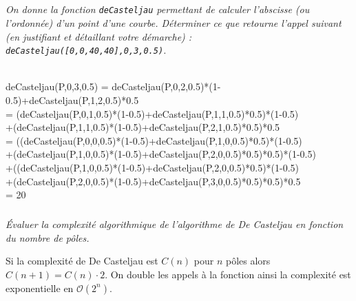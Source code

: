 \documentclass[10pt,fleqn]{article} %
\begin{document}
\subparagraph{}
\textit{On donne la fonction \texttt{deCasteljau} permettant de calculer l'abscisse (ou l'ordonnée) d'un point d'une courbe. Déterminer ce que retourne l'appel suivant (en justifiant et détaillant votre démarche) : ~\\
\texttt{deCasteljau([0,0,40,40],0,3,0.5)}.}
\ifprof
\begin{corrige} ~\\

\noindent deCasteljau(P,0,3,0.5) =  deCasteljau(P,0,2,0.5)*(1-0.5)+deCasteljau(P,1,2,0.5)*0.5 ~\\

\noindent  = (deCasteljau(P,0,1,0.5)*(1-0.5)+deCasteljau(P,1,1,0.5)*0.5)*(1-0.5) ~\\ 
\indent+(deCasteljau(P,1,1,0.5)*(1-0.5)+deCasteljau(P,2,1,0.5)*0.5)*0.5 ~\\

\noindent  = ((deCasteljau(P,0,0,0.5)*(1-0.5)+deCasteljau(P,1,0,0.5)*0.5)*(1-0.5)~\\ 
\indent +(deCasteljau(P,1,0,0.5)*(1-0.5)+deCasteljau(P,2,0,0.5)*0.5)*0.5)*(1-0.5) ~\\ 
\indent+((deCasteljau(P,1,0,0.5)*(1-0.5)+deCasteljau(P,2,0,0.5)*0.5)*(1-0.5)  ~\\
\indent +(deCasteljau(P,2,0,0.5)*(1-0.5)+deCasteljau(P,3,0,0.5)*0.5)*0.5)*0.5 ~\\

\noindent  = 20
\end{corrige}
\else
\fi

\subparagraph{}
\textit{Évaluer la complexité algorithmique de l'algorithme de De Casteljau en fonction du nombre de pôles.}
\ifprof
\begin{corrige}
Si la complexité de De Casteljau est $C(n)$ pour $n$ pôles alors $C(n+1) = C(n) \cdot 2$. On double les appels à la fonction ainsi la complexité est exponentielle en $\mathcal{O}\left(2^n\right)$.
\end{corrige}
\else
\fi
\end{document}
